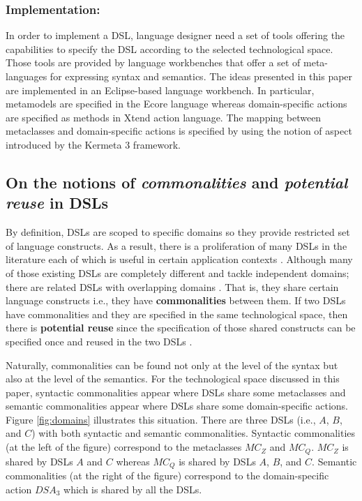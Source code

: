 \vspace{-3mm}
\subsubsection{Implementation:} In order to implement a DSL, language designer need a set of tools offering the capabilities to specify the DSL according to the selected technological space. Those tools are provided by language workbenches that offer a set of meta-languages for expressing syntax and semantics. The ideas presented in this paper are implemented in an Eclipse-based language workbench. In particular, metamodels are specified in the Ecore language whereas domain-specific actions are specified as methods in Xtend action language. The mapping between metaclasses and domain-specific actions is specified by using the notion of aspect introduced by the Kermeta 3 framework. 

\subsection{On the notions of \textit{commonalities} and \textit{potential reuse} in DSLs}

By definition, DSLs are scoped to specific domains so they provide restricted set of language constructs. As a result, there is a proliferation of many DSLs in the literature each of which is useful in certain application contexts \cite{Mernik:2005b}. Although many of those existing DSLs are completely different and tackle independent domains; there are related DSLs with overlapping domains \cite[p. 60-61]{voelter:2013}. That is, they share certain language constructs i.e., they have \textbf{commonalities} between them. If two DSLs have commonalities and they are specified in the same technological space, then there is \textbf{potential reuse} since the specification of those shared constructs can be specified once and reused in the two DSLs \cite[p. 60-61]{voelter:2013}.

Naturally, commonalities can be found not only at the level of the syntax but also at the level of the semantics. For the technological space discussed in this paper, syntactic commonalities appear where DSLs share some metaclasses and semantic commonalities appear where DSLs share some domain-specific actions. Figure \ref{fig:domains} illustrates this situation. There are three DSLs (i.e., $A$, $B$, and $C$) with both syntactic and semantic commonalities. Syntactic commonalities (at the left of the figure) correspond to the metaclasses $MC_Z$ and $MC_Q$. $MC_Z$ is shared by DSLs $A$ and $C$ whereas $MC_Q$ is shared by DSLs $A$, $B$, and $C$. Semantic commonalities (at the right of the figure) correspond to the domain-specific action $DSA_3$ which is shared by all the DSLs. 


